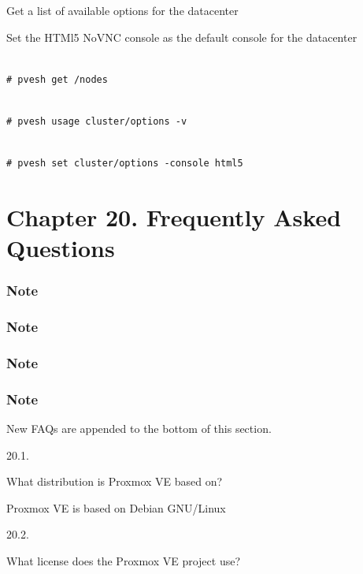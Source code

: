 Get a list of available options for the datacenter

Set the HTMl5 NoVNC console as the default console for the datacenter

\begin{lstlisting}

# pvesh get /nodes

\end{lstlisting}

\begin{lstlisting}

# pvesh usage cluster/options -v

\end{lstlisting}

\begin{lstlisting}

# pvesh set cluster/options -console html5

\end{lstlisting}


\section{Chapter 20. Frequently Asked Questions}

\subsubsection{Note}

\subsubsection{Note}

\subsubsection{Note}

\subsubsection{Note}

New FAQs are appended to the bottom of this section.

20.1.

What distribution is Proxmox VE based on?

Proxmox VE is based on Debian GNU/Linux

20.2.

What license does the Proxmox VE project use?

